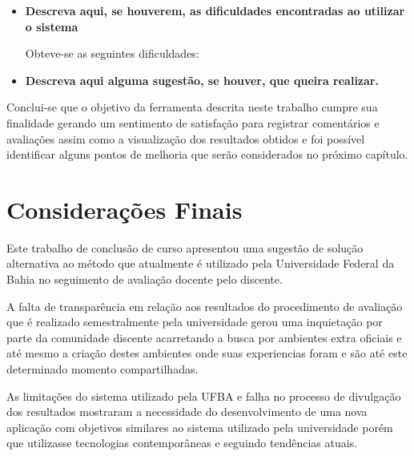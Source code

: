\documentclass[12pt, a4paper]{report}
\begin{document}
\begin{itemize}
\item{\textbf{ Descreva aqui, se houverem, as dificuldades encontradas ao utilizar o sistema}}

Obteve-se as seguintes dificuldades:

\item{\textbf{ Descreva aqui alguma sugestão, se houver, que queira realizar.}}

\end{itemize}

Conclui-se que o objetivo da ferramenta descrita neste trabalho cumpre sua finalidade gerando um sentimento de satisfação para registrar comentários e avaliações assim como a visualização dos resultados obtidos e foi possível identificar alguns pontos de melhoria que serão considerados no próximo capítulo.

\chapter{Considerações Finais}
\label{chap:consideracoes}

Este trabalho de conclusão de curso apresentou uma sugestão de solução alternativa ao método que atualmente é utilizado pela Universidade Federal da Bahia no seguimento de avaliação docente pelo discente.

A falta de transparência em relação aos resultados do procedimento de avaliação que é realizado semestralmente pela universidade gerou uma inquietação por parte da comunidade discente acarretando a busca por ambientes extra oficiais e até mesmo a criação destes ambientes onde suas experiencias foram e são até este determinado momento compartilhadas.

As limitações do sistema utilizado pela UFBA e falha no processo de divulgação dos resultados mostraram a necessidade do desenvolvimento de uma nova aplicação com objetivos similares ao sistema utilizado pela universidade porém que  utilizasse tecnologias contemporâneas e seguindo tendências atuais. 
\end{document}
